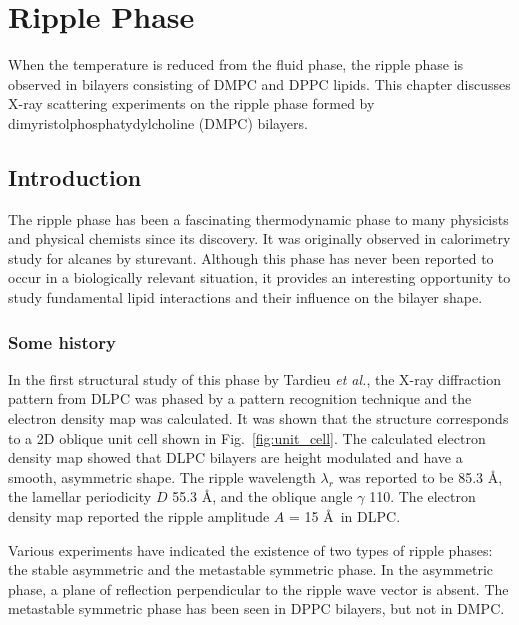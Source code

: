 \chapter{Ripple Phase}\label{chap:ripple}
When the temperature is reduced from the fluid phase, 
the ripple phase is observed in bilayers consisting of DMPC and DPPC lipids.
This chapter discusses X-ray scattering experiments on the ripple phase 
formed by dimyristolphosphatydylcholine (DMPC) bilayers. 

\section{Introduction}\label{sec:ripple_introduction}
The ripple phase has been a fascinating thermodynamic phase to many physicists 
and physical chemists since its discovery. It was originally observed in 
calorimetry study for alcanes by sturevant. Although this phase has never been reported to 
occur in a biologically relevant situation, it provides an interesting opportunity
to study fundamental lipid interactions and their influence on the bilayer 
shape. 

\subsection{Some history}
In the first structural study of this phase by Tardieu \textit{et al.},
the X-ray diffraction pattern from DLPC was phased by a pattern recognition
technique and the electron density map was calculated. It was shown that the structure
corresponds to a 2D oblique unit cell shown in Fig.~\ref{fig:unit_cell}.
The calculated 
electron density map showed that DLPC bilayers are height modulated
and have a smooth, asymmetric shape. 
The ripple wavelength $\lambda_r$ was reported to be 85.3 \AA, 
the lamellar periodicity $D$ 55.3 \AA, and the oblique angle
$\gamma$ 110\textdegree. 
The electron density map reported the ripple amplitude $A$ = 15 \AA\ in DLPC.

Various experiments have indicated the existence of two types of ripple phases:
the stable asymmetric and the metastable symmetric phase. In the asymmetric
phase, a plane of reflection perpendicular to the ripple wave vector is 
absent. The metastable symmetric phase has been seen in DPPC bilayers, but not
in DMPC.

